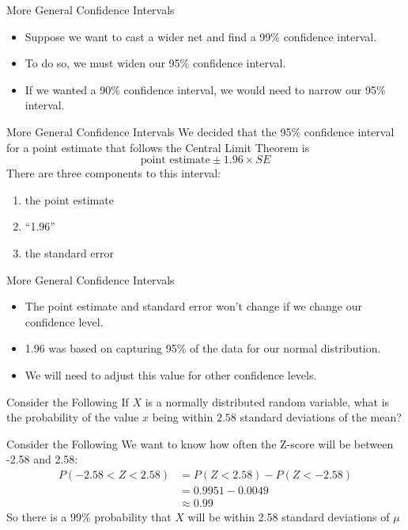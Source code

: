 \begin{frame}{More General Confidence Intervals}
    \begin{itemize}
        \item Suppose we want to cast a wider net and find a 99\% confidence interval.  
        \item To do so, we must widen our 95\% confidence interval.
        \item If we wanted a 90\% confidence interval, we would need to narrow our 95\% interval. 
    \end{itemize}
\end{frame}

\begin{frame}{More General Confidence Intervals}
    We decided that the 95\% confidence interval for a point estimate that follows the Central Limit Theorem is
    \[
        \text{point estimate} \pm 1.96 \times SE
    \]
    There are three components to this interval: 
    \begin{enumerate}
        \item the point estimate
        \item “1.96”
        \item the standard error
    \end{enumerate}
\end{frame}

\begin{frame}{More General Confidence Intervals}
    \begin{itemize}
        \item The point estimate and standard error won't change if we change our confidence level.
        \item 1.96 was based on capturing 95\% of the data for our normal distribution.
        \item We will need to adjust this value for other confidence levels.
    \end{itemize}
\end{frame}

\begin{frame}{Consider the Following}
    If $X$ is a normally distributed random variable, what is the probability of the value $x$ being within $2.58$ standard deviations of the mean?
\end{frame}

\begin{frame}{Consider the Following}
    We want to know how often the Z-score will be between -2.58 and 2.58:
    \begin{align*}
        P(-2.58 < Z < 2.58) &= P(Z < 2.58) - P(Z < -2.58) \\
        &= 0.9951-0.0049 \\
        &\approx 0.99
    \end{align*}
    So there is a 99\% probability that $X$ will be within 2.58 standard deviations of $\mu$
\end{frame}

